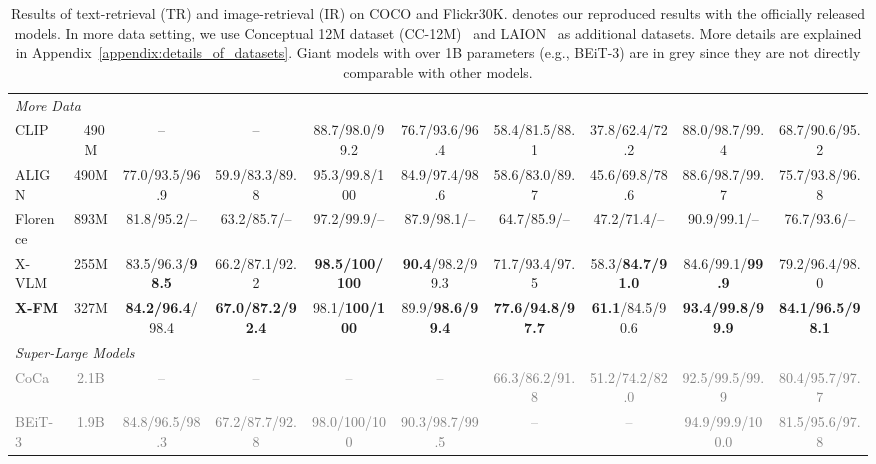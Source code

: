 \documentclass[11pt]{article}
\newcommand{\ModelNameB}{X-FM\xspace}
\newcommand{\babyx}{X-VLM}
\begin{document}
\begin{table*}[t]
{\begin{tabular}{lc|cccc|cccc}
\midrule
\multicolumn{10}{l}{\textit{More Data}} \\
CLIP & ~490M & -- & -- & 88.7/98.0/99.2 & 76.7/93.6/96.4 & 58.4/81.5/88.1 & 37.8/62.4/72.2 &
88.0/98.7/99.4 & 68.7/90.6/95.2 \\
ALIGN & 490M & 77.0/93.5/96.9 & 59.9/83.3/89.8 & 95.3/99.8/100 & 84.9/97.4/98.6 & 58.6/83.0/89.7 & 45.6/69.8/78.6 & 88.6/98.7/99.7 & 75.7/93.8/96.8 \\
Florence & 893M & 81.8/95.2/-- & 63.2/85.7/-- & 97.2/99.9/-- & 87.9/98.1/-- & 64.7/85.9/-- &
47.2/71.4/-- & 90.9/99.1/-- & 76.7/93.6/-- \\
\babyx & 255M & 83.5/96.3/{\bf 98.5} & 66.2/87.1/92.2 & {\bf 98.5/100/100} & {\bf 90.4}/98.2/99.3 &
71.7/93.4/97.5 & 58.3/{\bf 84.7/91.0} & 84.6/99.1/{\bf 99.9} & 79.2/96.4/98.0 \\
{\bf \ModelNameB} & 327M & {\bf 84.2/96.4}/98.4 & {\bf 67.0/87.2/92.4} & 98.1/{\bf 100/100} & 89.9/{\bf 98.6/99.4} & {\bf 77.6/94.8/97.7} & {\bf 61.1}/84.5/90.6 & {\bf 93.4/99.8/99.9} & {\bf 84.1/96.5/98.1} \\
\midrule
\midrule
\multicolumn{6}{l}{\textit{Super-Large Models}} \\





\textcolor{gray}{CoCa} & \textcolor{gray}{2.1B} & \textcolor{gray}{--} & \textcolor{gray}{--} & \textcolor{gray}{--} & \textcolor{gray}{--} &
\textcolor{gray}{66.3/86.2/91.8} &
\textcolor{gray}{51.2/74.2/82.0} &
\textcolor{gray}{92.5/99.5/99.9} &
\textcolor{gray}{80.4/95.7/97.7} \\
\textcolor{gray}{BEiT-3} & \textcolor{gray}{1.9B} & \textcolor{gray}{84.8/96.5/98.3} & \textcolor{gray}{67.2/87.7/92.8} & \textcolor{gray}{98.0/100/100} & \textcolor{gray}{90.3/98.7/99.5} &
\textcolor{gray}{--} & \textcolor{gray}{--} & \textcolor{gray}{94.9/99.9/100.0} & \textcolor{gray}{81.5/95.6/97.8} \\


\bottomrule
\end{tabular}}
\caption{Results of text-retrieval (TR) and image-retrieval (IR) on COCO and Flickr30K.
 denotes our reproduced results with the officially released models. 
In more data setting, we use Conceptual 12M dataset (CC-12M)~\cite{changpinyo2021conceptual} and LAION~\cite{schuhmann2022laion} as additional datasets. More details are explained in Appendix~\ref{appendix:details_of_datasets}. 
Giant models with over 1B parameters (e.g., BEiT-3) are in grey since they are not directly comparable with other models.
}
\label{tab:retrieval}
\end{table*}
\end{document}
